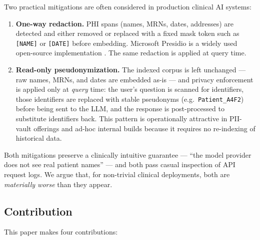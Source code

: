 \documentclass[11pt,a4paper]{article}
\begin{document}
Two practical mitigations are often considered in production clinical AI
systems:

\begin{enumerate}
  \item \textbf{One-way redaction.} PHI spans (names, MRNs, dates, addresses)
        are detected and either removed or replaced with a fixed mask token
        such as \texttt{[NAME]} or \texttt{[DATE]} before embedding. Microsoft
        Presidio is a widely used open-source implementation
        \cite{presidio2024}. The same redaction is applied at query time.
  \item \textbf{Read-only pseudonymization.} The indexed corpus is left
        unchanged --- raw names, MRNs, and dates are embedded as-is --- and
        privacy enforcement is applied only at \emph{query} time: the user's
        question is scanned for identifiers, those identifiers are replaced
        with stable pseudonyms (e.g.\ \texttt{Patient\_A4F2}) before being
        sent to the LLM, and the response is post-processed to substitute
        identifiers back. This pattern is operationally attractive in
        PII-vault offerings and ad-hoc internal builds because it requires
        no re-indexing of historical data.
\end{enumerate}

Both mitigations preserve a clinically intuitive guarantee --- ``the model
provider does not see real patient names'' --- and both pass casual
inspection of API request logs. We argue that, for non-trivial clinical
deployments, both are \emph{materially worse} than they appear.

\subsection*{Contribution}

This paper makes four contributions:
\end{document}
